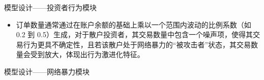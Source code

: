 \begin{frame}{模型设计——投资者行为模块}
    \begin{itemize}
        \item 订单数量通常通过在账户余额的基础上乘以一个范围内波动的比例系数（如 0.2 到 0.5）生成，对于散户投资者，其交易数量中包含一个噪声项，使得其交易行为更具不确定性，且若该散户处于网络暴力的“被攻击者”状态，其交易数量会受到放大，体现出行为激进化特征。
    \end{itemize}
    
\end{frame}

\begin{frame}{模型设计——网络暴力模块}

\end{frame}

